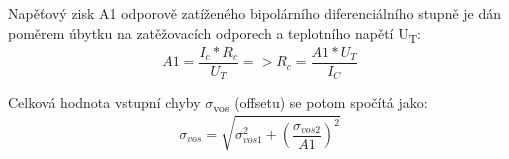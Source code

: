 Napěťový zisk A1 odporově zatíženého bipolárního diferenciálního stupně je dán poměrem úbytku na zatěžovacích odporech a teplotního napětí U\textsubscript{T}:
\begin{equation}
A1=\frac{I_{c}*R_{c}}{U_{T}} => R_{c}=\frac{A1*U_{T}}{I_{C}}
\end{equation}

Celková hodnota vstupní chyby $\sigma$\textsubscript{vos} (offsetu) se potom spočítá jako:
\begin{equation}
\sigma_{vos}=\sqrt{\sigma_{vos1}^2+(\frac{\sigma_{vos2}}{A1})^2}
\end{equation}


















